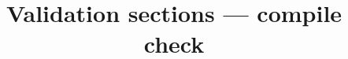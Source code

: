\documentclass[conference]{IEEEtran}
\begin{document}
\title{Validation sections --- compile check}\author{}\maketitle
\label{fig:method}\label{fig:glue}


\end{document}
